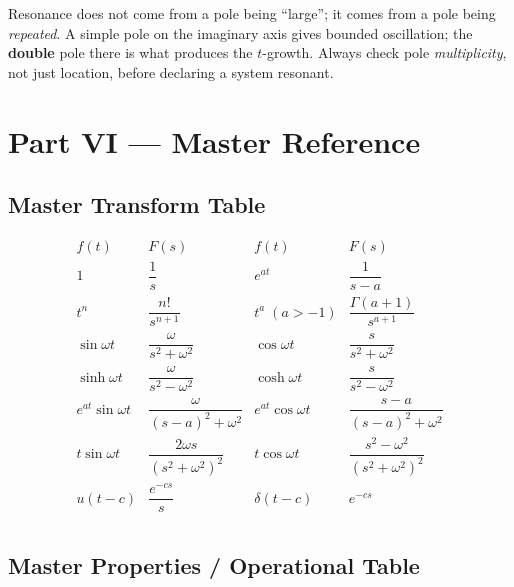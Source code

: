 \begin{warningbox}
Resonance does not come from a pole being ``large''; it comes from a pole being
\emph{repeated}. A simple pole on the imaginary axis gives bounded oscillation; the
\textbf{double} pole there is what produces the $t$-growth. Always check pole
\emph{multiplicity}, not just location, before declaring a system resonant.
\end{warningbox}

\clearpage
{}
{}
\section*{Part VI --- Master Reference}

\subsection{Master Transform Table}

\begin{formulabox}
\renewcommand{\arraystretch}{1.5}
\[
\begin{array}{ll|ll}
f(t) & F(s) & f(t) & F(s) \\ \hline
1 & \dfrac{1}{s} & e^{at} & \dfrac{1}{s-a} \\
t^n & \dfrac{n!}{s^{n+1}} & t^{a}\;(a>-1) & \dfrac{\Gamma(a+1)}{s^{a+1}} \\
\sin\omega t & \dfrac{\omega}{s^2+\omega^2} & \cos\omega t & \dfrac{s}{s^2+\omega^2} \\
\sinh\omega t & \dfrac{\omega}{s^2-\omega^2} & \cosh\omega t & \dfrac{s}{s^2-\omega^2} \\
e^{at}\sin\omega t & \dfrac{\omega}{(s-a)^2+\omega^2} & e^{at}\cos\omega t & \dfrac{s-a}{(s-a)^2+\omega^2} \\
t\sin\omega t & \dfrac{2\omega s}{(s^2+\omega^2)^2} & t\cos\omega t & \dfrac{s^2-\omega^2}{(s^2+\omega^2)^2} \\
u(t-c) & \dfrac{e^{-cs}}{s} & \delta(t-c) & e^{-cs} \\
\end{array}
\]
\end{formulabox}

\subsection{Master Properties / Operational Table}

